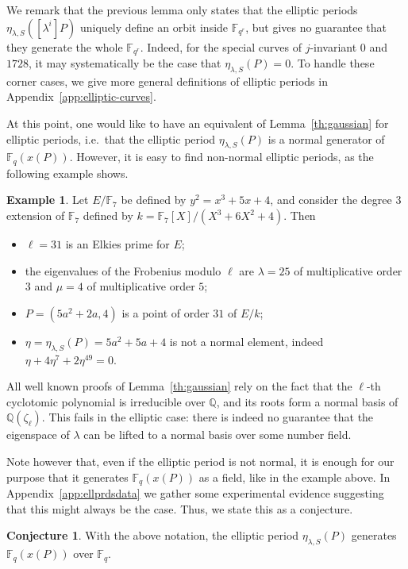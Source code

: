 \documentclass[12pt]{article}
\theoremstyle{plain}
\theoremstyle{definition}
\newtheorem{conjecture}[theorem]{Conjecture}
\newtheorem{example}[theorem]{Example}
\def\Q{\ensuremath{\mathbb{Q}}}
\def\F{\ensuremath{\mathbb{F}}}
\begin{document}
We remark that the previous lemma only states that the elliptic
periods $\eta_{\lambda,S}([\lambda^i]P)$ uniquely define an orbit
inside $\F_{q^r}$, but gives no guarantee that they generate the whole
$\F_{q^r}$. Indeed, for the special curves of $j$-invariant $0$ and
$1728$, it may systematically be the case that
$\eta_{\lambda,S}(P)=0$.
To handle these corner cases, we give more general definitions of elliptic
periods in Appendix~\ref{app:elliptic-curves}.

At this point, one would like to have an equivalent of
Lemma~\ref{th:gaussian} for elliptic periods, i.e.\ that the elliptic
period $\eta_{\lambda,S}(P)$ is a normal generator of $\F_q(x(P))$.
However, it is easy to find non-normal elliptic periods, as the
following example shows.

\begin{example}
\label{ex:non-normal}
  Let $E/\F_7$ be defined by $y^2 = x^3 + 5 x + 4$, and consider the
  degree $3$ extension of $\F_7$ defined by
  $k=\F_7[X]/(X^3 + 6 X^2 + 4)$. Then
  \begin{itemize}
  \item $\ell = 31$ is an Elkies prime for $E$;
  \item the eigenvalues of the Frobenius modulo $\ell$ are
    $\lambda = 25$ of multiplicative order $3$ and $\mu = 4$ of
    multiplicative order $5$;
  \item $P = (5 a^2+2 a, 4)$ is a point of order $31$ of $E/k$;
  \item $\eta=\eta_{\lambda,S}(P) = 5 a^2 + 5 a + 4$ is not a normal
    element, indeed
    $\eta + 4 \eta^7 + 2 \eta^{49} = 0$.
  \end{itemize}
\end{example}

All well known proofs of Lemma~\ref{th:gaussian} rely on the fact that
the $\ell$-th cyclotomic polynomial is irreducible over $\Q$, and its
roots form a normal basis of $\Q(\zeta_\ell)$. %
This fails in the elliptic case: there is indeed no guarantee that the
eigenspace of $\lambda$ can be lifted to a normal basis over some
number field.

Note however that, even if the elliptic period is not normal, it is
enough for our purpose that it generates $\F_q(x(P))$ as a field, like
in the example above.  In Appendix~\ref{app:ellprdsdata} we gather
some experimental evidence suggesting that this might always be the
case. Thus, we state this as a conjecture.

\begin{conjecture}
\label{conj:ellperiods}
With the above notation, the elliptic period $\eta_{\lambda,S}(P)$
generates $\F_q(x(P))$ over $\F_q$.
\end{conjecture}
\end{document}
